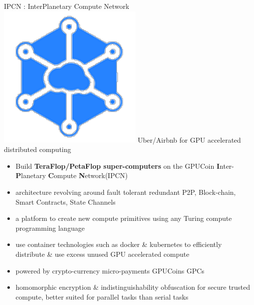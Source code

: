 \begin{frame}[t]{IPCN
	: InterPlanetary Compute Network}
	\includegraphics[scale=.15]{static/ipcn-p2p}
	 Uber/Airbnb for GPU accelerated distributed computing
 \begin{itemize}[<+-| alert@+>]
 \item Build \textbf{TeraFlop/PetaFlop super-computers} on  the GPUCoin \textbf{I}nter-\textbf{P}lanetary \textbf{C}ompute \textbf{N}etwork(IPCN)
 \item architecture revolving around fault tolerant redundant P2P, Block-chain, Smart Contracts, State Channels
 \item a platform to create new compute primitives using any Turing compute programming language
 \item use container technologies such as docker \& kubernetes to efficiently distribute \& use excess unused GPU accelerated compute
 \item powered by crypto-currency micro-payments GPUCoins GPCs
 \item  homomorphic encryption \& indistinguishability obfuscation for secure trusted compute, better suited for parallel tasks than serial tasks
 \end{itemize}
\end{frame}